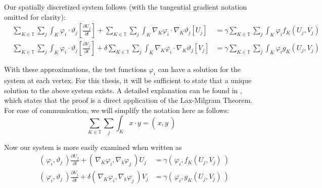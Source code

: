 \documentclass[12pt]{article}
\begin{document}
Our spatially discretized system follows (with the tangential gradient notation omitted for clarity):
\begin{equation}
\begin{aligned}
&\sum_{K\in\mathbb{T}}\sum_j 
\int_K \varphi_i\cdot\vartheta_j\left[\frac{\partial U_j}{\partial t}\right] + 
\sum_{K\in\mathbb{T}}\sum_j
\int_K \nabla_K\varphi_i\cdot\nabla_K \vartheta_j \left[U_j\right] &= 
\gamma\sum_{K\in\mathbb{T}}\sum_j
\int_K \varphi_i f_K(U_j,V_j) \\
&\sum_{K\in\mathbb{T}}\sum_j
\int_K \varphi_i\cdot\vartheta_j\left[\frac{\partial V_j}{\partial t}\right] + 
\delta\sum_{K\in\mathbb{T}}\sum_j
\int_K \nabla_K\varphi_i\cdot\nabla_K \vartheta_j \left[V_j\right] &=
\gamma\sum_{K\in\mathbb{T}}\sum_j
\int_K \varphi_i g_K(U_j,V_j)
\end{aligned}
\end{equation}


With these approximations, the test functions $\varphi_i$ can have a solution for the system at each vertex. For this thesis, it will be sufficient to state that a unique solution to the above system exists. A detailed explanation can be found in \cite{Dziuk2013}, which states that the proof is a direct application of the Lax-Milgram Theorem. For ease of communication, we will simplify the notation here as follows:
$$ \sum_{K\in\mathbb{T}}\sum_j\int_K x\cdot y = \left(\frac{}{}x,y~\right) $$

\noindent Now our system is more easily examined when written as
\begin{equation}\label{eq:simp}
\begin{aligned}
&\left(\frac{}{}\varphi_i,\vartheta_j~\right)\frac{\partial U_j}{\partial t} + \left(\frac{}{}\nabla_K\varphi_i, \nabla_k\varphi_j~\right) U_j &= \gamma \left(\frac{}{}\varphi_i, f_K(U_j, V_j)~\right) \\
&\left(\frac{}{}\varphi_i,\vartheta_j~\right)\frac{\partial V_j}{\partial t} + \delta\left(\frac{}{}\nabla_K\varphi_i, \nabla_k\varphi_j~\right) V_j &= \gamma \left(\frac{}{}\varphi_i, g_K(U_j, V_j)~\right)
\end{aligned}	
\end{equation} 

\end{document}
